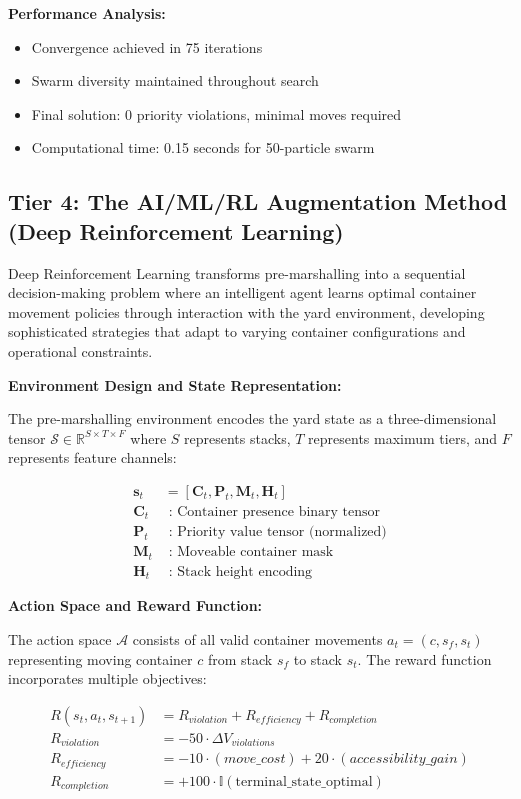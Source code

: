 \documentclass{article}
\begin{document}
\textbf{Performance Analysis:}
\begin{itemize}
\item Convergence achieved in 75 iterations
\item Swarm diversity maintained throughout search
\item Final solution: 0 priority violations, minimal moves required
\item Computational time: 0.15 seconds for 50-particle swarm
\end{itemize}

\subsection{Tier 4: The AI/ML/RL Augmentation Method (Deep Reinforcement Learning)}

Deep Reinforcement Learning transforms pre-marshalling into a sequential decision-making problem where an intelligent agent learns optimal container movement policies through interaction with the yard environment, developing sophisticated strategies that adapt to varying container configurations and operational constraints.

\textbf{Environment Design and State Representation:}

The pre-marshalling environment encodes the yard state as a three-dimensional tensor $\mathcal{S} \in \mathbb{R}^{S \times T \times F}$ where $S$ represents stacks, $T$ represents maximum tiers, and $F$ represents feature channels:

\begin{align}
\mathbf{s}_t &= [\mathbf{C}_t, \mathbf{P}_t, \mathbf{M}_t, \mathbf{H}_t] \\
\mathbf{C}_t &\text{ : Container presence binary tensor} \\
\mathbf{P}_t &\text{ : Priority value tensor (normalized)} \\
\mathbf{M}_t &\text{ : Moveable container mask} \\
\mathbf{H}_t &\text{ : Stack height encoding}
\end{align}

\textbf{Action Space and Reward Function:}

The action space $\mathcal{A}$ consists of all valid container movements $a_t = (c, s_f, s_t)$ representing moving container $c$ from stack $s_f$ to stack $s_t$. The reward function incorporates multiple objectives:

\begin{align}
R(s_t, a_t, s_{t+1}) &= R_{violation} + R_{efficiency} + R_{completion} \\
R_{violation} &= -50 \cdot \Delta V_{violations} \\
R_{efficiency} &= -10 \cdot (move\_cost) + 20 \cdot (accessibility\_gain) \\
R_{completion} &= +100 \cdot \mathbb{I}(\text{terminal\_state\_optimal})
\end{align}
\end{document}
